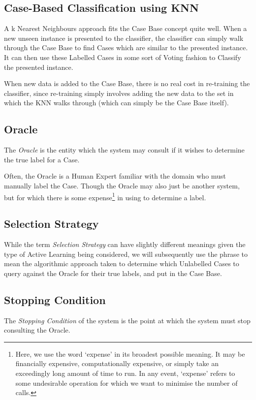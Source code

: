 \documentclass[a4paper,11pt]{report}
\begin{document}
\subsection{Case-Based Classification using KNN}

A k Nearest Neighbours approach fits the Case Base concept quite well. When a new unseen instance is presented to the classifier, the classifier can simply walk through the Case Base to find Cases which are similar to the presented instance. It can then use these Labelled Cases in some sort of Voting fashion to Classify the presented instance.

When new data is added to the Case Base, there is no real cost in re-training the classifier, since re-training simply involves adding the new data to the set in which the KNN walks through (which can simply be the Case Base itself).

\subsection{Oracle}
The \emph{Oracle} is the entity which the system may consult if it wishes to determine the true label for a Case.

Often, the Oracle is a Human Expert familiar with the domain who must manually label the Case. Though the Oracle may also just be another system, but for which there is some expense\footnote{Here, we use the word `expense' in its broadest possible meaning. It may be financially expensive, computationally expensive, or simply take an exceedingly long amount of time to run. In any event, `expense' refers to some undesirable operation for which we want to minimise the number of calls.} in using to determine a label. 

\subsection{Selection Strategy}
While the term \emph{Selection Strategy} can have slightly different meanings given the type of Active Learning being considered, we will subsequently use the phrase to mean the algorithmic approach taken to determine which Unlabelled Cases to query against the Oracle for their true labels, and put in the Case Base.

\subsection{Stopping Condition}
The \emph{Stopping Condition} of the system is the point at which the system must stop consulting the Oracle.
\end{document}
